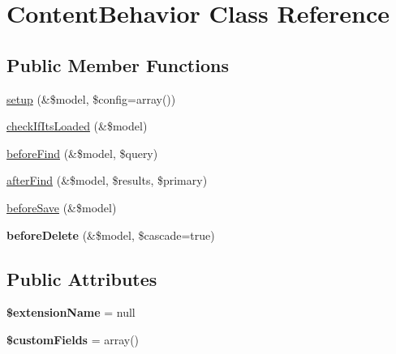 \hypertarget{class_content_behavior}{
\section{\-Content\-Behavior \-Class \-Reference}
\label{class_content_behavior}
}
\subsection*{\-Public \-Member \-Functions}
\begin{DoxyCompactItemize}
\item 
\hyperlink{class_content_behavior_a452822643b4364f6c4b6a20af95d6462}{setup} (\&\$model, \$config=array())
\item 
\hyperlink{class_content_behavior_a882bfc5341b3f76903e1f8b1a917adab}{check\-If\-Its\-Loaded} (\&\$model)
\item 
\hyperlink{class_content_behavior_a051cb56c90e71bc686284e1ead3cac63}{before\-Find} (\&\$model, \$query)
\item 
\hyperlink{class_content_behavior_adb54e34db4918e3c8de3e69373966361}{after\-Find} (\&\$model, \$results, \$primary)
\item 
\hyperlink{class_content_behavior_a00ff6cc8480844f27fef4f0cd41d185f}{before\-Save} (\&\$model)
\item 
\hypertarget{class_content_behavior_a9ed0284d99a3db7592fdcb4dbdfc15f9}{
{\bfseries before\-Delete} (\&\$model, \$cascade=true)}
\label{class_content_behavior_a9ed0284d99a3db7592fdcb4dbdfc15f9}

\end{DoxyCompactItemize}
\subsection*{\-Public \-Attributes}
\begin{DoxyCompactItemize}
\item 
\hypertarget{class_content_behavior_a59a50437bb125815bd1b315055535854}{
{\bfseries \$extension\-Name} = null}
\label{class_content_behavior_a59a50437bb125815bd1b315055535854}

\item 
\hypertarget{class_content_behavior_a3e067e8148e4ef691717f02f85980167}{
{\bfseries \$custom\-Fields} = array()}
\label{class_content_behavior_a3e067e8148e4ef691717f02f85980167}

\end{DoxyCompactItemize}


